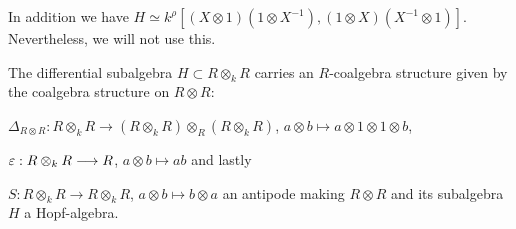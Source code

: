 \item In addition we have $H \simeq k^\rho[(X\otimes1)(1 \otimes X^{-1}),(1\otimes X)(X^{-1} \otimes 1)]$. Nevertheless, we will not use this.
\en
\begin{prop}\label{prop_hopf_struct}
The differential subalgebra $H \subset R\otimes_k R$ carries an $R$-coalgebra structure given by the coalgebra structure on $R\otimes R$:
\bn
\item $\Delta_{R\otimes R} : R\otimes_k R \longrightarrow (R\otimes_k R) \otimes_R (R\otimes_k R)$, $a \otimes b \longmapsto a \otimes 1 \otimes 1 \otimes b$,
\item $\varepsilon : R\otimes_k R \longrightarrow R$, $a \otimes b \longmapsto a b$ and lastly
\item $S: R \otimes_k R \longrightarrow R \otimes_k R$, $a \otimes b \longmapsto b \otimes a$ an antipode
\en
making $R\otimes R$ and its subalgebra $H$ a Hopf-algebra.
\end{prop}
